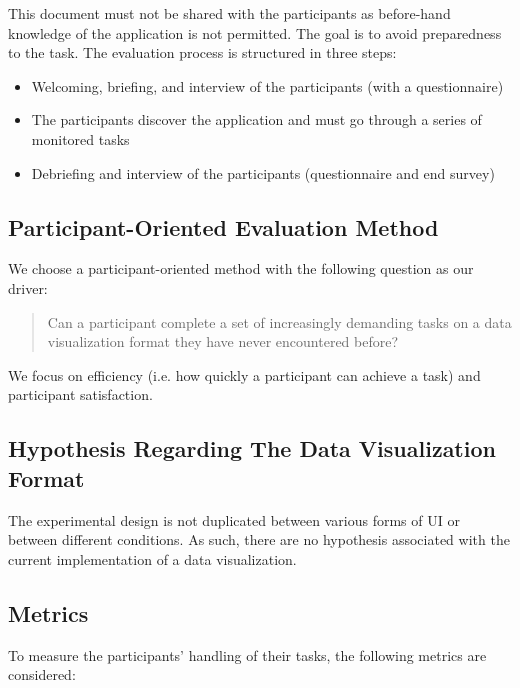 \documentclass[twocolumn, letterpaper,13pt]{scrartcl}
\begin{document}
    This document must not be shared with the participants as before-hand knowledge of the application is not permitted. The goal is to avoid preparedness to the task.
    \newline
    \newline
    The evaluation process is structured in three steps:
    \begin{itemize}
        \item Welcoming, briefing, and interview of the participants (with a questionnaire)
        \item The participants discover the application and must go through a series of monitored tasks
        \item Debriefing and interview of the participants (questionnaire and end survey)
    \end{itemize}

    \subsection*{Participant-Oriented Evaluation Method}
    
    We choose a participant-oriented method with the following question as our driver: 
    
    \begin{quote}
        Can a participant complete a set of increasingly demanding tasks on a data visualization format they have never encountered before?
    \end{quote}
    
    We focus on efficiency (i.e. how quickly a participant can achieve a task) and participant satisfaction.

    \subsection*{Hypothesis Regarding The Data Visualization Format}
 
    The experimental design is not duplicated between various forms of UI or between different conditions. As such, there are no hypothesis associated with the current implementation of a data visualization.
 
    \subsection*{Metrics}
    
    To measure the participants' handling of their tasks, the following metrics are considered:
    
\end{document}
